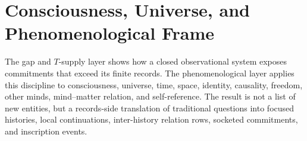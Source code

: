 \section{Consciousness, Universe, and Phenomenological Frame}
\label{sec:visions-philosophy-phenomenology-framework}

The gap and \(T\)-supply layer shows how a closed observational system
exposes commitments that exceed its finite records. The
phenomenological layer applies this discipline to consciousness,
universe, time, space, identity, causality, freedom, other minds,
mind--matter relation, and self-reference. The result is not a list of
new entities, but a records-side translation of traditional questions
into focused histories, local continuations, inter-history relation
rows, socketed commitments, and inscription events.






